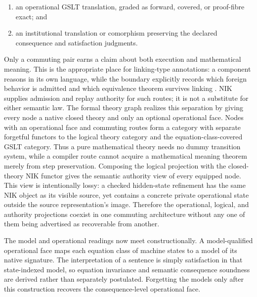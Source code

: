 \documentclass[11pt]{article}
\theoremstyle{definition}
\theoremstyle{remark}
\begin{document}
\begin{enumerate}
\item an operational GSLT translation, graded as forward, covered, or
  proof-fibre exact; and
\item an institutional translation or comorphism preserving the declared
  consequence and satisfaction judgments.
\end{enumerate}

Only a commuting pair earns a claim about both execution and mathematical
meaning.  This is the appropriate place for linking-type annotations: a
component reasons in its own language, while the boundary explicitly records
which foreign behavior is admitted and which equivalence theorem survives
linking \cite{PattersonAhmedLinkingTypes}.  NIK supplies admission and replay
authority for such routes; it is not a substitute for either semantic law.
The formal theory graph realizes this separation by giving every node a native closed
theory and only an optional operational face.  Nodes with an operational face
and commuting routes form a category with separate forgetful functors to the
logical theory category and the equation-class-covered GSLT category.  Thus a
pure mathematical theory needs no dummy transition system, while a compiler
route cannot acquire a mathematical meaning theorem merely from step
preservation.  Composing the logical projection with the closed-theory NIK
functor gives the semantic authority view of every equipped node.  This view is
intentionally lossy: a checked hidden-state refinement has the same NIK object
as its visible source, yet contains a concrete private operational state
outside the source representation's image.  Therefore the operational,
logical, and authority projections coexist in one commuting architecture
without any one of them being advertised as recoverable from another.

The model and operational readings now meet constructionally.  A
model-qualified operational face maps each equation class of machine states to
a model of its native signature.  The interpretation of a sentence is simply
satisfaction in that state-indexed model, so equation invariance and semantic
consequence soundness are derived rather than separately postulated.  Forgetting
the models only after this construction recovers the consequence-level
operational face.
\end{document}
